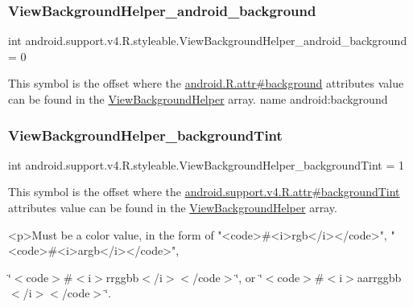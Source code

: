 \subsubsection{\texorpdfstring{View\+Background\+Helper\+\_\+android\+\_\+background}{ViewBackgroundHelper\_android\_background}}
{\footnotesize\ttfamily int android.\+support.\+v4.\+R.\+styleable.\+View\+Background\+Helper\+\_\+android\+\_\+background = 0\hspace{0.3cm}{\ttfamily [static]}}

This symbol is the offset where the \hyperlink{}{android.\+R.\+attr\#background} attribute\textquotesingle{}s value can be found in the \hyperlink{classandroid_1_1support_1_1v4_1_1R_1_1styleable_aef8d9a5ffe04de4b6d0f50e89e307ca4}{View\+Background\+Helper} array.  name android\+:background \mbox{\label{classandroid_1_1support_1_1v4_1_1R_1_1styleable_a27d86c38662cdce2ce4f892520e28b4c}} 
\subsubsection{\texorpdfstring{View\+Background\+Helper\+\_\+background\+Tint}{ViewBackgroundHelper\_backgroundTint}}
{\footnotesize\ttfamily int android.\+support.\+v4.\+R.\+styleable.\+View\+Background\+Helper\+\_\+background\+Tint = 1\hspace{0.3cm}{\ttfamily [static]}}

This symbol is the offset where the \hyperlink{classandroid_1_1support_1_1v4_1_1R_1_1attr_aee5568276e5effa7f9682abb574dbb69}{android.\+support.\+v4.\+R.\+attr\#background\+Tint} attribute\textquotesingle{}s value can be found in the \hyperlink{classandroid_1_1support_1_1v4_1_1R_1_1styleable_aef8d9a5ffe04de4b6d0f50e89e307ca4}{View\+Background\+Helper} array.

\begin{DoxyVerb}      <p>Must be a color value, in the form of "<code>#<i>rgb</i></code>", "<code>#<i>argb</i></code>",
\end{DoxyVerb}
 \char`\"{}$<$code$>$\#$<$i$>$rrggbb$<$/i$>$$<$/code$>$\char`\"{}, or \char`\"{}$<$code$>$\#$<$i$>$aarrggbb$<$/i$>$$<$/code$>$\char`\"{}. 

